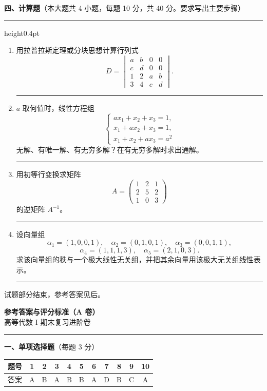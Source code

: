 \documentclass[12pt]{ctexart}
\newcommand{\bigsection}[2]{%
  \vspace{7pt}%
  {\noindent\bfseries\large #1}\hfill{\normalsize（本大题共 #2）}\par
  \vspace{2pt}\hrule height0.4pt\vspace{8pt}}
\newcommand{\workarea}[1]{\par\vspace{0.35em}\noindent\rule{\linewidth}{0.25pt}\par\vspace{#1}}
\begin{document}
\clearpage
\bigsection{四、计算题}{4 小题，每题 10 分，共 40 分。要求写出主要步骤}

\begin{enumerate}[label=\arabic*.]
\item 用拉普拉斯定理或分块思想计算行列式
  \[
  D=\begin{vmatrix}
  a&b&0&0\\
  c&d&0&0\\
  1&2&a&b\\
  3&4&c&d
  \end{vmatrix}.
  \]
\workarea{5.2cm}

\item $a$ 取何值时，线性方程组
  \[
  \begin{cases}
  a x_1+x_2+x_3=1,\\
  x_1+a x_2+x_3=1,\\
  x_1+x_2+a x_3=a^{2}
  \end{cases}
  \]
  无解、有唯一解、有无穷多解？在有无穷多解时求出通解。
\workarea{6.0cm}

\clearpage
\item 用初等行变换求矩阵
  \[
  A=\begin{pmatrix}
  1&2&1\\
  2&5&2\\
  1&0&3
  \end{pmatrix}
  \]
  的逆矩阵 $A^{-1}$。
\workarea{6.0cm}

\item 设向量组
  \[
  \alpha_1=(1,0,0,1),\quad \alpha_2=(0,1,0,1),\quad
  \alpha_3=(0,0,1,1),
  \]
  \[
  \alpha_4=(1,1,1,3),\quad \alpha_5=(2,1,0,3).
  \]
  求该向量组的秩与一个极大线性无关组，并把其余向量用该极大无关组线性表示。
\workarea{5.5cm}
\end{enumerate}

\begin{center}\small 试题部分结束，参考答案见后。\end{center}

\clearpage
\begin{center}
  {\Large\bfseries 参考答案与评分标准（A 卷）}\\[2pt]
  {\small 高等代数 I 期末复习进阶卷}
\end{center}
\vspace{6pt}\hrule\vspace{12pt}

\noindent\textbf{一、单项选择题}（每题 3 分）
\begin{center}
\renewcommand{\arraystretch}{1.3}
\begin{tabular}{|c|c|c|c|c|c|c|c|c|c|c|}
\hline
题号 & 1&2&3&4&5&6&7&8&9&10\\\hline
答案 & A&B&A&B&B&A&D&B&C&A\\\hline
\end{tabular}
\end{center}
\end{document}
